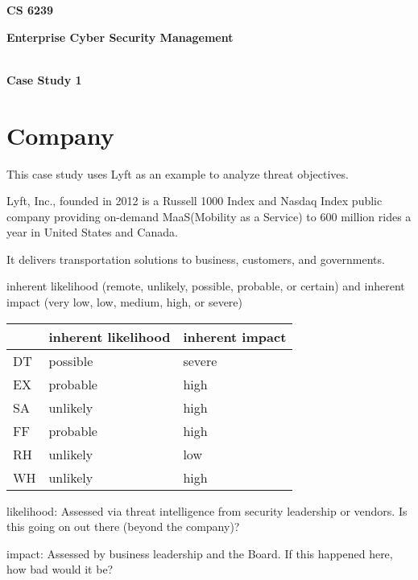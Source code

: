 \documentclass[11pt]{article}
\date{}
\begin{document}
\vspace{-5cm}


\begin{center}
\textbf{\Large CS 6239}

\textbf{\Large Enterprise Cyber Security Management}

\textbf{\\ \Large Case Study 1}
\end{center}

\section{Company}

This case study uses Lyft as an example to analyze threat objectives.

Lyft, Inc., founded in 2012  is a Russell 1000 Index and Nasdaq Index public company providing on-demand MaaS(Mobility as a Service) to 600 million rides a year in United States and Canada.

It delivers transportation solutions to business, customers, and governments.

\begin{boxB}
    inherent likelihood (remote, unlikely, possible, probable, or certain) and inherent impact (very low, low, medium, high, or severe)
\end{boxB}

\begin{table}[]
\begin{tabular}{|l|l|l|}
\hline
   & \textbf{inherent likelihood} & \textbf{inherent impact} \\ \hline
DT & possible            & severe          \\ \hline
EX & probable            & high           \\ \hline
SA & unlikely            & high            \\ \hline
FF & probable            & high            \\ \hline
RH & unlikely            & low          \\ \hline
WH & unlikely            & high          \\ \hline
\end{tabular}
\end{table}

\begin{boxB}
    likelihood: Assessed via threat intelligence from security leadership or vendors. Is this going on out there (beyond the company)?

    impact: Assessed by business leadership and the Board. If this happened here, how bad would it be?


\end{boxB}
\end{document}
